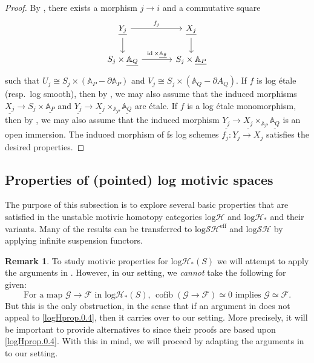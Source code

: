 \documentclass[11pt, a4paper]{amsart}
\theoremstyle{definition}
\newtheorem{rmk}[thm]{Remark}
\numberwithin{equation}{subsection}
\newcommand{\A}{\mathbb{A}}
\newcommand{\id}{\operatorname{id}}   			%
\renewcommand{\ul}{\underline}
\newcommand{\cF}{\mathcal{F}}
\newcommand{\cG}{\mathcal{G}}
\newcommand{\cofib}{\operatorname{cofib}}
\newcommand{\inflogH}{\mathrm{log}\mathcal{H}}
\newcommand{\inflogHpt}{\mathrm{log}\mathcal{H}_\ast}
\newcommand{\inflogSH}{\mathrm{log}\mathcal{SH}}
\newcommand{\inflogSHS}{\mathrm{log}\mathcal{SH}^{\mathrm{eff}}}
\begin{document}
\begin{proof}
By \cite[Th\'eor\`eme IV.8.8.2]{EGA},
there exists a morphism $j\to i$ and a commutative square
\[
\begin{tikzcd}[column sep=large]
\ul{Y_j}\ar[d]\ar[r,"f_j"]&
\ul{X_j}\ar[d]
\\
S_j\times \ul{\A_Q}\ar[r,"\id\times \ul{\A_\theta}"]&
S_j\times \ul{\A_P}
\end{tikzcd}
\]
such that $U_j\cong S_j\times (\A_P-\partial \A_P)$ and $V_j\cong S_j\times (\A_Q-\partial A_Q)$.
If $f$ is log \'etale (resp.\ log smooth),
then by \cite[Proposition IV.17.7.8]{EGA},
we may also assume that the induced morphisms $\ul{X_j}\to S_j\times \ul{\A_P}$ and $\ul{Y_j}\to \ul{X_j}\times_{\ul{\A_P}}\ul{\A_Q}$ are \'etale.
If $f$ is a log \'etale monomorphism,
then by \cite[Th\'eor\`eme IV.8.10.5(3)]{EGA},
we may also assume that the induced morphism $\ul{Y_j}\to \ul{X_j}\times_{\ul{\A_P}}\ul{\A_Q}$ is an open immersion.
The induced morphism of fs log schemes $f_j\colon Y_j\to X_j$ satisfies the desired properties.
\end{proof}








\subsection{Properties of (pointed) log motivic spaces}\label{proplogH}

The purpose of this subsection is to explore several basic properties that are satisfied in the unstable motivic 
homotopy categories $\inflogH$ and $\inflogHpt$ and their variants.
Many of the results can be transferred to $\inflogSHS$ and $\inflogSH$ by applying infinite suspension functors.




\begin{rmk} To study motivic properties for $\inflogHpt(S)$ we will attempt to apply the arguments in \cite[\S 7]{logDM}.  
However, 
in our setting, 
we \emph{cannot} take the following for given:
\begin{equation}
\label{logHprop.0.4}
\text{For a map $\cG\to \cF$ in $\inflogHpt(S)$, $\cofib(\cG\to \cF)\simeq 0$ implies $\cG\simeq \cF$.}
\end{equation}
But this is the only obstruction, in the sense that if an argument in \cite[\S 7]{logDM} 
does not appeal to \eqref{logHprop.0.4}, 
then it carries over to our setting.
More precisely, 
it will be important to provide alternatives to \cite[Propositions C.1.5, C.1.7]{logDM} 
since their proofs are based upon \eqref{logHprop.0.4}.
With this in mind, 
we will proceed by adapting the arguments in \cite[\S 7]{logDM} to our setting.
\end{rmk}
\end{document}
